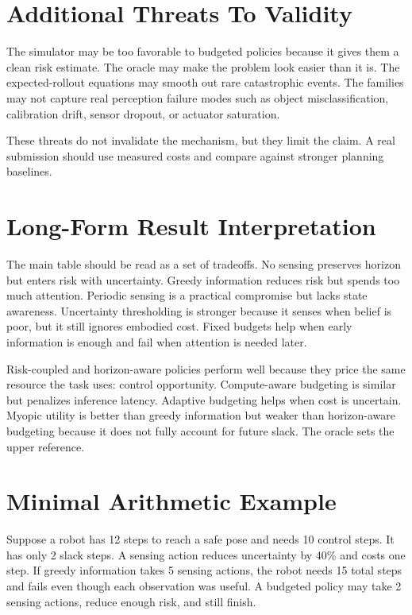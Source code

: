 \documentclass{article}
\begin{document}
\section{Additional Threats To Validity}

The simulator may be too favorable to budgeted policies because it gives them a
clean risk estimate. The oracle may make the problem look easier than it is.
The expected-rollout equations may smooth out rare catastrophic events. The
families may not capture real perception failure modes such as object
misclassification, calibration drift, sensor dropout, or actuator saturation.

These threats do not invalidate the mechanism, but they limit the claim. A real
submission should use measured costs and compare against stronger planning
baselines.

\section{Long-Form Result Interpretation}

The main table should be read as a set of tradeoffs. No sensing preserves
horizon but enters risk with uncertainty. Greedy information reduces risk but
spends too much attention. Periodic sensing is a practical compromise but lacks
state awareness. Uncertainty thresholding is stronger because it senses when
belief is poor, but it still ignores embodied cost. Fixed budgets help when
early information is enough and fail when attention is needed later.

Risk-coupled and horizon-aware policies perform well because they price the
same resource the task uses: control opportunity. Compute-aware budgeting is
similar but penalizes inference latency. Adaptive budgeting helps when cost is
uncertain. Myopic utility is better than greedy information but weaker than
horizon-aware budgeting because it does not fully account for future slack.
The oracle sets the upper reference.

\section{Minimal Arithmetic Example}

Suppose a robot has 12 steps to reach a safe pose and needs 10 control steps.
It has only 2 slack steps. A sensing action reduces uncertainty by 40\% and
costs one step. If greedy information takes 5 sensing actions, the robot needs
15 total steps and fails even though each observation was useful. A budgeted
policy may take 2 sensing actions, reduce enough risk, and still finish.
\end{document}

